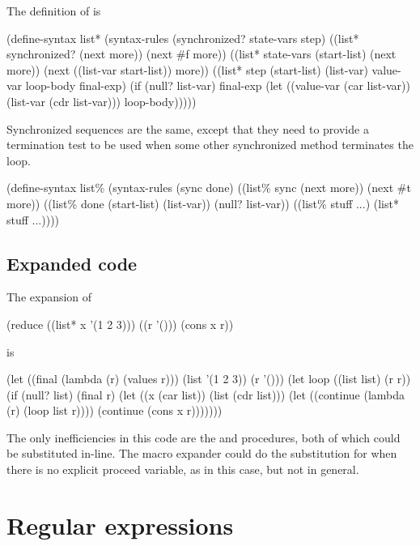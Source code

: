 The definition of  is
\begin{example}
(define-syntax list*
  (syntax-rules (synchronized? state-vars step)
    ((list* synchronized? (next more))
     (next \#f more))
    ((list* state-vars (start-list) (next more))
     (next ((list-var start-list)) more))
    ((list* step (start-list) (list-var)
            value-var loop-body final-exp)
     (if (null? list-var)
         final-exp
         (let ((value-var (car list-var))
               (list-var (cdr list-var)))
           loop-body)))))
\end{example}

Synchronized sequences are the same, except that they need to
 provide a termination test to be used when some other synchronized
 method terminates the loop.
\begin{example}
(define-syntax list\%
  (syntax-rules (sync done)
    ((list\% sync (next more))
     (next \#t more))
    ((list\% done (start-list) (list-var))
     (null? list-var))
    ((list\% stuff ...)
     (list* stuff ...))))
\end{example}

\subsection{Expanded code}

The expansion of 
\begin{example}
  (reduce ((list* x '(1 2 3)))
          ((r '()))
    (cons x r))
\end{example}
is
\begin{example}
  (let ((final (lambda (r) (values r)))
        (list '(1 2 3))
        (r '()))
    (let loop ((list list) (r r))
      (if (null? list)
          (final r)
          (let ((x (car list))
                (list (cdr list)))
            (let ((continue (lambda (r)
                              (loop list r))))
              (continue (cons x r)))))))
\end{example}

The only inefficiencies in this code are the  and 
 procedures, both of which could be substituted in-line.
The macro expander could do the substitution for  when there
 is no explicit proceed variable, as in this case, but not in general.

\section{Regular expressions}
\label{regexp-adt}

